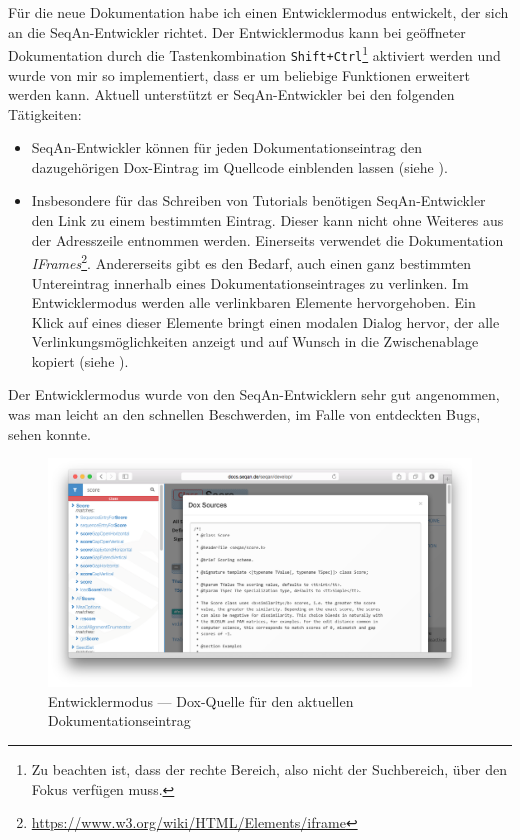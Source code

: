Für die neue Dokumentation habe ich einen Entwicklermodus entwickelt, der sich an die SeqAn-Entwickler richtet. Der Entwicklermodus kann bei geöffneter Dokumentation durch die Tastenkombination \texttt{Shift+Ctrl}\footnote{Zu beachten ist, dass der rechte Bereich, also nicht der Suchbereich, über den Fokus verfügen muss.} aktiviert werden und wurde von mir so implementiert, dass er um beliebige Funktionen erweitert werden kann. Aktuell unterstützt er SeqAn-Entwickler bei den folgenden Tätigkeiten:
\begin{itemize}
  \item SeqAn-Entwickler können für jeden Dokumentationseintrag den dazugehörigen Dox-Eintrag im Quellcode einblenden lassen (siehe ).
  \item Insbesondere für das Schreiben von Tutorials benötigen SeqAn-Entwickler den Link zu einem bestimmten Eintrag. Dieser kann nicht ohne Weiteres aus der Adresszeile entnommen werden. Einerseits verwendet die Dokumentation \textit{IFrames}\footnote{\url{https://www.w3.org/wiki/HTML/Elements/iframe}}. Andererseits gibt es den Bedarf, auch einen ganz bestimmten Untereintrag innerhalb eines Dokumentationseintrages zu verlinken. Im Entwicklermodus werden alle verlinkbaren Elemente hervorgehoben. Ein Klick auf eines dieser Elemente bringt einen modalen Dialog hervor, der alle Verlinkungsmöglichkeiten anzeigt und auf Wunsch in die Zwischenablage kopiert (siehe ).
\end{itemize}

Der Entwicklermodus wurde von den SeqAn-Entwicklern sehr gut angenommen, was man leicht an den schnellen Beschwerden, im Falle von entdeckten Bugs, sehen konnte.

\begin{figure}[ht!]
  \centering
    \includegraphics[width=0.9\linewidth]{Figures/dox/devmode-dox.png}
    \caption{Entwicklermodus --- Dox-Quelle für den aktuellen Dokumentationseintrag}
    \label{fig:dox-devmode-dox}
\end{figure}

